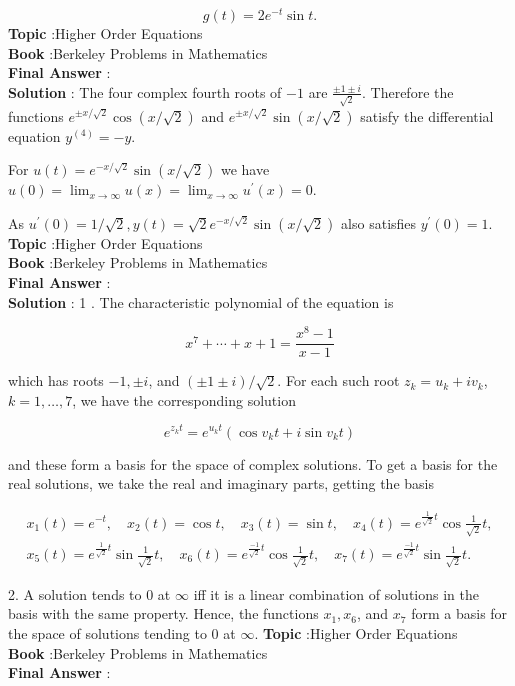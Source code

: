 \documentclass[10pt]{article}
\begin{document}
$$
g(t)=2 e^{-t} \sin t .
$$
\textbf{Topic} :Higher Order Equations \\
\textbf{Book} :Berkeley Problems in Mathematics\\
\textbf{Final Answer} :\\


\textbf{Solution} : The four complex fourth roots of $-1$ are $\frac{\pm 1 \pm i}{\sqrt{2}}$. Therefore the functions $e^{\pm x / \sqrt{2}} \cos (x / \sqrt{2})$ and $e^{\pm x / \sqrt{2}} \sin (x / \sqrt{2})$ satisfy the differential equation $y^{(4)}=-y$.

For $u(t)=e^{-x / \sqrt{2}} \sin (x / \sqrt{2})$ we have $u(0)=\lim _{x \rightarrow \infty} u(x)=\lim _{x \rightarrow \infty} u^{\prime}(x)=0$.

As $u^{\prime}(0)=1 / \sqrt{2}, y(t)=\sqrt{2} e^{-x / \sqrt{2}} \sin (x / \sqrt{2})$ also satisfies $y^{\prime}(0)=1$. \\
\textbf{Topic} :Higher Order Equations \\
\textbf{Book} :Berkeley Problems in Mathematics\\
\textbf{Final Answer} :\\


\textbf{Solution} : 1 . The characteristic polynomial of the equation is

$$
x^{7}+\cdots+x+1=\frac{x^{8}-1}{x-1}
$$

which has roots $-1, \pm i$, and $(\pm 1 \pm i) / \sqrt{2}$. For each such root $z_{k}=u_{k}+i v_{k}$, $k=1, \ldots, 7$, we have the corresponding solution

$$
e^{z_{k} t}=e^{u_{k} t}\left(\cos v_{k} t+i \sin v_{k} t\right)
$$

and these form a basis for the space of complex solutions. To get a basis for the real solutions, we take the real and imaginary parts, getting the basis

$$
\begin{gathered}
x_{1}(t)=e^{-t}, \quad x_{2}(t)=\cos t, \quad x_{3}(t)=\sin t, \quad x_{4}(t)=e^{\frac{1}{\sqrt{2}} t} \cos \frac{1}{\sqrt{2}} t, \\
x_{5}(t)=e^{\frac{1}{\sqrt{2}} t} \sin \frac{1}{\sqrt{2}} t, \quad x_{6}(t)=e^{\frac{-1}{\sqrt{2}} t} \cos \frac{1}{\sqrt{2}} t, \quad x_{7}(t)=e^{\frac{-1}{\sqrt{2}} t} \sin \frac{1}{\sqrt{2}} t .
\end{gathered}
$$

2. A solution tends to 0 at $\infty$ iff it is a linear combination of solutions in the basis with the same property. Hence, the functions $x_{1}, x_{6}$, and $x_{7}$ form a basis for the space of solutions tending to 0 at $\infty$.
\textbf{Topic} :Higher Order Equations \\
\textbf{Book} :Berkeley Problems in Mathematics\\
\textbf{Final Answer} :\\
\end{document}
